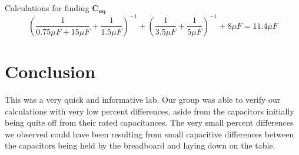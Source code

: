\documentclass[titlepage]{article}
\begin{document}
    {{Calculations for finding $\mathbf{C_{eq}}$}}
        $$\left( \frac{1}{0.75\mu F+15\mu F}+\frac{1}{1.5\mu F} \right)^{-1}+\left(\frac{1}{3.5\mu F}+\frac{1}{5\mu F}\right)^{-1}+8\mu F  = 11.4 \mu F$$


    
    
  	\section{Conclusion}
    This was a very quick and informative lab. Our group was able to verify our calculations with very low percent differences, aside from the capacitors initially being quite off from their rated capacitances. The very small percent differences we observed could have been resulting from small capacitive differences between the capacitors being held by the breadboard and laying down on the table. 
\end{document}

